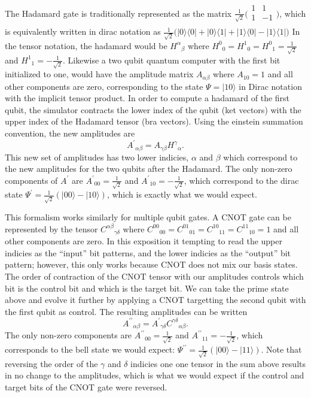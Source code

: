 \documentclass[%
 reprint,
 amsmath,amssymb,
 aps,
]{revtex4-2}
\begin{document}
The Hadamard gate is traditionally represented as the matrix $\frac{1}{\sqrt{2}}\big(\begin{smallmatrix}
1 & 1\\
1 & -1\\
\end{smallmatrix}\big)$, which is equivalently written in dirac notation as $\frac{1}{\sqrt{2}} \big( |0\rangle\langle0| + |0\rangle\langle1| + |1\rangle\langle0| - |1\rangle\langle1|\big)$ In the tensor notation, the hadamard would be ${H^{\alpha}}_{\beta}$ where ${H^{0}}_{0} = {H^{1}}_{0} = {H^{0}}_{1} = \frac{1}{\sqrt{2}}$ and ${H^{1}}_{1} = -\frac{1}{\sqrt{2}}$. Likewise a two qubit quantum computer with the first bit initialized to one, would have the amplitude matrix $A_{\alpha\beta}$ where $A_{10} = 1$ and all other components are zero, corresponding to the state $\Psi = |10\rangle$ in Dirac notation with the implicit tensor product. In order to compute a hadamard of the first qubit, the simulator contracts the lower index of the qubit (ket vectors) with the upper index of the Hadamard tensor (bra vectors). Using the einstein summation convention, the new amplitudes are $${A^\prime}_{\alpha\beta} = A_{\gamma\beta} {H^{\gamma}}_{\alpha}.$$ This new set of amplitudes has two lower indicies, $\alpha$ and $\beta$ which correspond to the new amplitudes for the two qubits after the Hadamard. The only non-zero components of $A^{\prime}$ are ${A^{\prime}}_{00} = \frac{1}{\sqrt{2}}$ and ${A^{\prime}}_{10} = -\frac{1}{\sqrt{2}}$, which correspond to the dirac state $\Psi^{\prime} = \frac{1}{\sqrt{2}} (|00\rangle - |10\rangle)$, which is exactly what we would expect.

This formalism works similarly for multiple qubit gates. A CNOT gate can be represented by the tensor ${C^{\alpha\beta}}_{\gamma\delta}$ where ${C^{00}}_{00} = {C^{01}}_{01} = {C^{10}}_{11} = {C^{11}}_{10} = 1$ and all other components are zero. In this exposition it tempting to read the upper indicies as the ``input'' bit patterns, and the lower indicies as the ``output'' bit pattern; however, this only works because CNOT does not mix our basis states. The order of contraction of the CNOT tensor with our amplitudes controls which bit is the control bit and which is the target bit. We can take the prime state above and evolve it further by applying a CNOT targetting the second qubit with the first qubit as control. The resulting amplitudes can be written $${A^{\prime\prime}}_{\alpha\beta} = {A^\prime}_{\gamma\delta}{C^{\gamma\delta}}_{\alpha\beta}.$$ The only non-zero components are ${A^{\prime\prime}}_{00} = \frac{1}{\sqrt{2}}$ and ${A^{\prime\prime}}_{11} = -\frac{1}{\sqrt{2}}$, which corresponds to the bell state we would expect: $\Psi^{\prime\prime} = \frac{1}{\sqrt{2}} (|00\rangle - |11\rangle)$. Note that reversing the order of the $\gamma$ and $\delta$ indicies one one tensor in the sum above results in no change to the amplitudes, which is what we would expect if the control and target bits of the CNOT gate were reversed.
\end{document}
